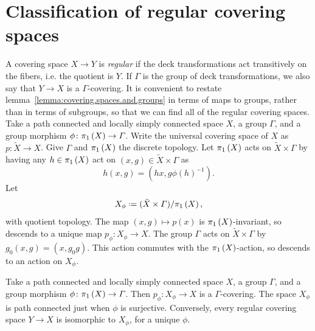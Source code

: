 \section{Classification of regular covering spaces}
A covering space \(X \to Y\) is \emph{regular} if the deck transformations act transitively on the fibers, i.e. the quotient is \(Y\).
If \(\Gamma\) is the group of deck transformations, we also say that \(Y\to X\) is a \(\Gamma\)-covering.
It is convenient to restate lemma~\vref{lemma:covering.spaces.and.groups} in terms of maps to groups, rather than in terms of subgroups, so that we can find all of the regular covering spaces.
Take a path connected and locally simply connected space \(X\), a group \(\Gamma\), and a group morphism \(\phi \colon \pi_{1}\left(X\right) \to \Gamma\).
Write the universal covering space of \(X\) as \(p \colon \tilde{X} \to X\).
Give \(\Gamma\) and \(\pi_{1}\left(X\right)\) the discrete topology.
Let \(\pi_{1}\left(X\right)\) acts on \(\tilde{X} \times \Gamma\) by having any
\(h \in \pi_{1}\left(X\right)\) act on \((x,g) \in \tilde{X} \times \Gamma\) as 
\[
h(x,g)=(hx,g\phi(h)^{-1}).
\]
Let
\[
X_{\phi} \defeq (\tilde{X} \times \Gamma)/\fundamentalGroup{X},
\]
with quotient topology.
The map \((x,g) \mapsto p(x)\) is \(\pi_{1}\left(X\right)\)-invariant, so descends to a unique map \(p_{\phi} \colon X_{\phi} \to X\).
The group \(\Gamma\) acts on \(\tilde{X} \times \Gamma\) by \(g_0(x,g)=(x,g_0g)\).
This action commutes with the \(\pi_{1}\left(X\right)\)-action, so descends to an action on \(X_{\phi}\).
\begin{theorem}\label{theorem:classify.regular.coverings}
Take a path connected and locally simply connected space \(X\), a group \(\Gamma\), and a group morphism \(\phi \colon \pi_{1}\left(X\right) \to \Gamma\).
Then \(p_{\phi} \colon X_{\phi} \to X\) is a \(\Gamma\)-covering.
The space \(X_{\phi}\) is path connected just when \(\phi\) is surjective.
Conversely, every regular covering space \(Y \to X\) is isomorphic to \(X_{\phi}\), for a unique \(\phi\).
\end{theorem}
